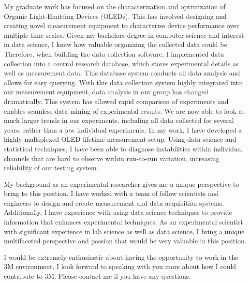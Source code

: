 \documentclass[11pt,a4paper,roman]{moderncv}        %
\newcommand{\company}{3M}
\newcommand{\shortcompany}{3M}
\begin{document}
My graduate work has focused on the characterization and optimization of Organic Light-Emitting Devices (OLEDs).  
This has involved designing and creating novel measurement equipment to characterize device performance over multiple time scales.
Given my bachelors degree in computer science and interest in data science, I knew how valuable organizing the collected data could be.  
Therefore, when building the data collection software, I implemented data collection into a central research database, which stores experimental details as well as measurement data.
This database system conducts all data analysis and allows for easy querying.
With this data collection system highly integrated into our measurement equipment, data analysis in our group has changed dramatically.
This system has allowed rapid comparison of experiments and enables seamless data mining of experimental results.  
We are now able to look at much larger trends in our experiments, including all data collected for several years, rather than a few individual experiments.
In my work, I have developed a highly multiplexed OLED lifetime measurement setup.  
Using data science and statistical techniques, I have been able to diagnose instabilities within individual channels that are hard to observe within run-to-run variation, increasing reliability of our testing system.




My background as an experimental researcher gives me a unique perspective to bring to this position.  
I have worked with a team of fellow scientists and engineers to design and create measurement and data acquisition systems.  
Additionally, I have experience with using data science techniques to provide information that enhances experimental techniques.
As an experimental scientist with significant experience in lab science as well as data science, I bring a unique multifaceted perspective and passion that would be very valuable in this position. 

I would be extremely enthusiastic about having the opportunity to work in the \shortcompany{}  environment.
I look forward to speaking with you more about how I could contribute to \company{}.
Please contact me if you have any questions.



\makeletterclosing
\end{document}
